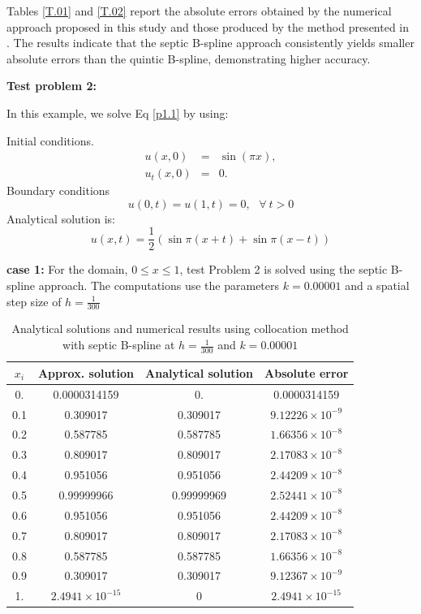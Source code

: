 \documentclass[10pt,letterpaper,twoside]{article}
\begin{document}
Tables \ref{T.01} and \ref{T.02} report the absolute errors obtained by the numerical approach proposed in this study and those produced by the method presented in \cite{35}. The results indicate that the septic B-spline approach consistently yields smaller absolute errors than the quintic B-spline, demonstrating higher accuracy.

\textbf{Test problem 2:}

In this example, we solve Eq \ref{p1.1} by using:

Initial conditions.
\begin{eqnarray*}
 u(x,0) &=&\sin(\pi x), \\
 u_{t}(x,0) &=&0.
\end{eqnarray*}
Boundary conditions
\begin{equation*}
 u(0,t)=u(1,t)=0,\ \ \ \forall\ t>0
\end{equation*}
Analytical solution is: \cite{27}
\begin{equation}\label{p1.02}
 u(x,t)=\frac{1}{2}(\sin \pi (x+t)+\sin \pi (x-t))
\end{equation}

\textbf{case 1:} For the domain, $0\leq x\leq 1$, test Problem 2 is solved using the septic B-spline approach. The computations use the parameters $ k = 0.00001 $ and a spatial step size of $ h = \frac{1}{300} $

\begin{table}[H]
 \centering
 \small
  \caption{Analytical solutions and numerical results using collocation method with septic B-spline at $h =\frac{1}{300}$ and $k = 0.00001$}
  \label{Table 02}
  \renewcommand{\arraystretch}{1.1}
  \begin{tabular}{|c|c|c|c|}
   \hline
   \textbf{$x_i$} & \textbf{Approx. solution} & \textbf{Analytical solution} & \textbf{Absolute error} \\ 
   \hline
   0.    & 0.0000314159 & 0.    & 0.0000314159 \\ \hline
   0.1   & 0.309017     & 0.309017     & \(9.12226 \times 10^{-9}\) \\ \hline
   0.2   & 0.587785     & 0.587785     & \(1.66356 \times 10^{-8}\) \\ \hline
   0.3   & 0.809017     & 0.809017     & \(2.17083 \times 10^{-8}\) \\ \hline
   0.4   & 0.951056     & 0.951056     & \(2.44209 \times 10^{-8}\) \\ \hline
   0.5   & 0.99999966           & 0.99999969           & \(2.52441 \times 10^{-8}\) \\ \hline
   0.6   & 0.951056     & 0.951056     & \(2.44209 \times 10^{-8}\) \\ \hline
   0.7   & 0.809017     & 0.809017     & \(2.17083 \times 10^{-8}\) \\ \hline
   0.8   & 0.587785     & 0.587785     & \(1.66356 \times 10^{-8}\) \\ \hline
   0.9   & 0.309017     & 0.309017     & \(9.12367 \times 10^{-9}\) \\ \hline
   1.    & \(2.4941 \times 10^{-15}\) & 0 & \(2.4941 \times 10^{-15}\) \\ \hline
  \end{tabular}
 \end{table}
\end{document}
